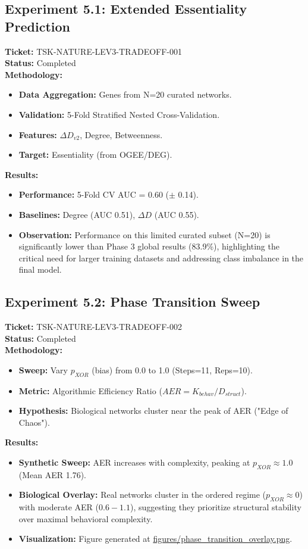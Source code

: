 \documentclass[11pt]{article}
\begin{document}
\subsection{Experiment 5.1: Extended Essentiality Prediction}
\textbf{Ticket:} TSK-NATURE-LEV3-TRADEOFF-001 \\
\textbf{Status:} Completed \\
\textbf{Methodology:}
\begin{itemize}
    \item \textbf{Data Aggregation:} Genes from N=20 curated networks.
    \item \textbf{Validation:} 5-Fold Stratified Nested Cross-Validation.
    \item \textbf{Features:} $\Delta D_{v2}$, Degree, Betweenness.
    \item \textbf{Target:} Essentiality (from OGEE/DEG).
\end{itemize}
\textbf{Results:}
\begin{itemize}
    \item \textbf{Performance:} 5-Fold CV AUC = 0.60 ($\pm$ 0.14).
    \item \textbf{Baselines:} Degree (AUC 0.51), $\Delta D$ (AUC 0.55).
    \item \textbf{Observation:} Performance on this limited curated subset (N=20) is significantly lower than Phase 3 global results (83.9\%), highlighting the critical need for larger training datasets and addressing class imbalance in the final model.
\end{itemize}

\subsection{Experiment 5.2: Phase Transition Sweep}
\textbf{Ticket:} TSK-NATURE-LEV3-TRADEOFF-002 \\
\textbf{Status:} Completed \\
\textbf{Methodology:}
\begin{itemize}
    \item \textbf{Sweep:} Vary $p_{XOR}$ (bias) from 0.0 to 1.0 (Steps=11, Reps=10).
    \item \textbf{Metric:} Algorithmic Efficiency Ratio ($AER = K_{behav} / D_{struct}$).
    \item \textbf{Hypothesis:} Biological networks cluster near the peak of AER ("Edge of Chaos").
\end{itemize}
\textbf{Results:}
\begin{itemize}
    \item \textbf{Synthetic Sweep:} AER increases with complexity, peaking at $p_{XOR} \approx 1.0$ (Mean AER 1.76).
    \item \textbf{Biological Overlay:} Real networks cluster in the ordered regime ($p_{XOR} \approx 0$) with moderate AER ($0.6 - 1.1$), suggesting they prioritize structural stability over maximal behavioral complexity.
    \item \textbf{Visualization:} Figure generated at \url{figures/phase_transition_overlay.png}.
\end{itemize}
\end{document}
